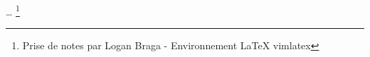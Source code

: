 \documentclass[a4paper,11pt]{article}
\author{}
\title{}
\begin{document}
\maketitle
\tableofcontents
\indent

\section{}


\newline 
\newline 
\newline 
\ldots
\footnote{Prise de notes par Logan Braga - Environnement LaTeX vimlatex}
\end{document}
